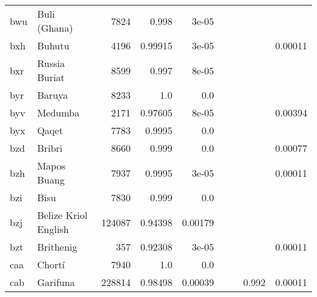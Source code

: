 \documentclass[11pt]{article}
\begin{document}
\begin{table*}[h]
{\begin{tabular}{llrrrrrrr}
bwu         & Buli (Ghana)         & 7824         & 0.998         & 3e-05         &          &          &          &          \\

bxh         & Buhutu         & 4196         & 0.99915         & 3e-05         &          &          &          & 0.00011         \\

bxr         & Russia Buriat         & 8599         & 0.997         & 8e-05         &          &          &          &          \\

byr         & Baruya         & 8233         & 1.0         & 0.0         &          &          &          &          \\

byv         & Medumba         & 2171         & 0.97605         & 8e-05         &          &          &          & 0.00394         \\

byx         & Qaqet         & 7783         & 0.9995         & 0.0         &          &          &          &          \\

bzd         & Bribri         & 8660         & 0.999         & 0.0         &          &          &          & 0.00077         \\

bzh         & Mapos Buang         & 7937         & 0.9995         & 3e-05         &          &          &          & 0.00011         \\

bzi         & Bisu         & 7830         & 0.999         & 0.0         &          &          &          &          \\

bzj         & Belize Kriol English         & 124087         & 0.94398         & 0.00179         &          &          &          &          \\

bzt         & Brithenig         & 357         & 0.92308         & 3e-05         &          &          &          & 0.00011         \\

caa         & Chortí         & 7940         & 1.0         & 0.0         &          &          &          &          \\

cab         & Garifuna         & 228814         & 0.98498         & 0.00039         &          &          & 0.992         & 0.00011         \\


\end{tabular}}
\end{table*}
\end{document}
